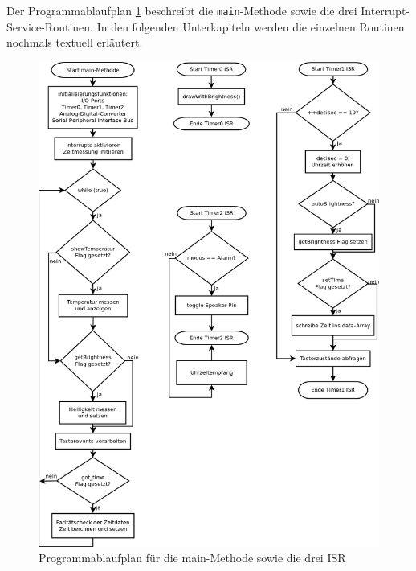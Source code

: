 Der Programmablaufplan \ref{fig_pap} beschreibt die \texttt{main}-Methode sowie die drei Interrupt-Service-Routinen. In den folgenden Unterkapiteln werden die einzelnen Routinen nochmals textuell erläutert.
\begin{figure}[htp]
\centering
\includegraphics[width=\textwidth]{skizzen/papTimerAndMain.png}
\caption{Programmablaufplan für die main-Methode sowie die drei ISR}\label{fig_pap}
\end{figure}
%
